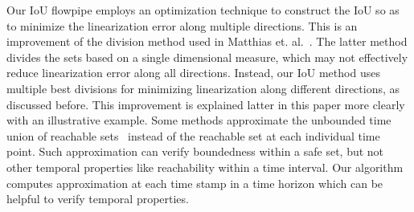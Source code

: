 Our IoU flowpipe employs an optimization technique to construct the
IoU so as to minimize the linearization error along multiple
directions.  This is an improvement of the division method used in
Matthias et. al.~\cite{althoff2008reachability}.  The latter method
divides the sets based on a single dimensional measure, which may not
effectively reduce linearization error along all directions.  Instead,
our IoU method uses multiple best divisions for minimizing
linearization along different directions, as discussed before.  This
improvement is explained latter in this paper more clearly with an
illustrative example.  Some methods approximate the unbounded time
union of reachable
sets~\cite{tiwari2008generating,prajna2006barrier,rodriguez2005generating}
instead of the reachable set at each individual time point. Such
approximation can verify boundedness within a safe set, but not other
temporal properties like reachability within a time interval.  Our
algorithm computes approximation at each time stamp in a time horizon
which can be helpful to verify temporal
properties.
